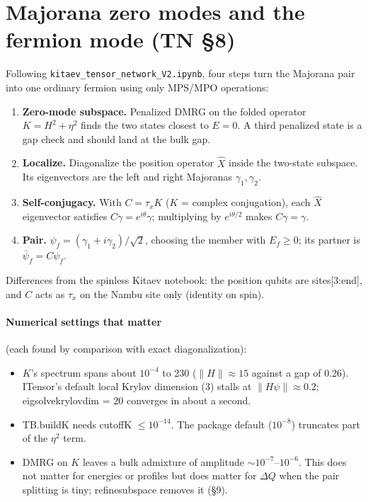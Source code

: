 \documentclass[11pt]{article}
\newcommand{\nb}[1]{\texttt{#1}}
\newcommand{\codeus}{\textunderscore\allowbreak}
\renewcommand{\code}[1]{{\ttfamily\let\_\codeus #1}}
\begin{document}
\section{Majorana zero modes and the fermion mode (TN §8)}

Following \nb{kitaev\_tensor\_network\_V2.ipynb}, four steps turn the Majorana pair into one ordinary fermion using only MPS/MPO operations:
\begin{enumerate}
\item \textbf{Zero-mode subspace.} Penalized DMRG on the folded operator $K=H^2+\eta^2$ finds the two states closest to $E=0$. A third penalized state is a gap check and should land at the bulk gap.
\item \textbf{Localize.} Diagonalize the position operator $\hat X$ inside the two-state subspace. Its eigenvectors are the left and right Majoranas $\gamma_1,\gamma_2$.
\item \textbf{Self-conjugacy.} With $C=\tau_xK$ ($K$ = complex conjugation), each $\hat X$ eigenvector satisfies $C\gamma=e^{i\theta}\gamma$; multiplying by $e^{i\theta/2}$ makes $C\gamma=\gamma$.
\item \textbf{Pair.} $\psi_f=(\gamma_1+i\gamma_2)/\sqrt2$, choosing the member with $E_f\ge0$; its partner is $\bar\psi_f=C\psi_f$.
\end{enumerate}
Differences from the spinless Kitaev notebook: the position qubits are \code{sites[3:end]}, and $C$ acts as $\tau_x$ on the Nambu site only (identity on spin).

\paragraph{Numerical settings that matter} (each found by comparison with exact diagonalization):
\begin{itemize}
\item $K$'s spectrum spans about $10^{-4}$ to 230 ($\|H\|\approx15$ against a gap of 0.26). ITensor's default local Krylov dimension (3) stalls at $\|H\psi\|\approx0.2$; \code{eigsolve\_krylovdim = 20} converges in about a second.
\item \code{TB.build\_K} needs \code{cutoff\_K} $\le10^{-14}$. The package default ($10^{-8}$) truncates part of the $\eta^2$ term.
\item DMRG on $K$ leaves a bulk admixture of amplitude $\sim10^{-7}$–$10^{-6}$. This does not matter for energies or profiles but does matter for $\Delta Q$ when the pair splitting is tiny; \code{refine\_subspace} removes it (§9).
\end{itemize}
\end{document}
